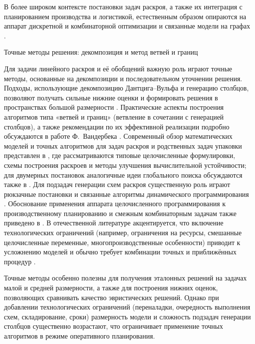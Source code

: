 В более широком контексте постановки задач раскроя, а также их интеграция с планированием производства и логистикой, естественным образом опираются на аппарат дискретной и комбинаторной оптимизации и связанные модели на графах \cite{струченков2017методы,Rajgorodsky2012, wolsey1998_integer_programming, schrijver1998_theory_lip}.



{Точные методы решения: декомпозиция и метод ветвей и границ}\label{subsec:theor_ch/exact_methods}

Для задачи линейного раскроя и её обобщений важную роль играют точные методы, основанные на декомпозиции и последовательном уточнении решения.
Подходы, использующие декомпозицию Дантцига--Вульфа и генерацию столбцов, позволяют получать сильные нижние оценки и формировать решения в пространствах большой размерности \cite{desaulniers2005_column_generation, dantzig1963_lp_extensions}.
Практические аспекты построения алгоритмов типа «ветвей и границ» (ветвление в сочетании с генерацией столбцов), а также рекомендации по их эффективной реализации подробно обсуждаются в работе Ф.~Вандербека \cite{vanderbeck2000integer}.
Современный обзор математических моделей и точных алгоритмов для задач раскроя и родственных задач упаковки представлен в \cite{delorme2016bin}, где рассматриваются типовые целочисленные формулировки, схемы построения раскроев и методы улучшения вычислительной устойчивости; для двумерных постановок аналогичные идеи глобального поиска обсуждаются также в \cite{huang2022_global_2dcsp}.
Для подзадач генерации схем раскроя существенную роль играют рюкзачные постановки и связанные алгоритмы динамического программирования \cite{martello1990_knapsack}.
Обоснование применения аппарата целочисленного программирования к производственному планированию и смежным комбинаторным задачам также приведено в \cite{pochet2006_prodplan_mip, wolsey1998_integer_programming}.
В отечественной литературе акцентируется, что включение технологических ограничений (например, ограничения на ресурсы, смешанные целочисленные переменные, многопроизводственные особенности) приводит к усложнению моделей и обычно требует комбинации точных и приближённых процедур \cite{листопад2017некоторые,архипов2014математические,васильев2016методы}.

Точные методы особенно полезны для получения эталонных решений на задачах малой и средней размерности, а также для построения нижних оценок, позволяющих сравнивать качество эвристических решений.
Однако при добавлении технологических ограничений (переналадки, очередность выполнения схем, складирование, сроки) размерность модели и сложность подзадач генерации столбцов существенно возрастают, что ограничивает применение точных алгоритмов в режиме оперативного планирования.

